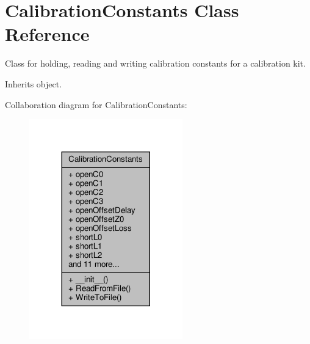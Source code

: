 \hypertarget{classSignalIntegrity_1_1Measurement_1_1CalKit_1_1CalibrationKit_1_1CalibrationConstants}{}\section{Calibration\+Constants Class Reference}
\label{classSignalIntegrity_1_1Measurement_1_1CalKit_1_1CalibrationKit_1_1CalibrationConstants}


Class for holding, reading and writing calibration constants for a calibration kit.  




Inherits object.



Collaboration diagram for Calibration\+Constants\+:\nopagebreak
\begin{figure}[H]
\begin{center}
\leavevmode
\includegraphics[width=188pt]{classSignalIntegrity_1_1Measurement_1_1CalKit_1_1CalibrationKit_1_1CalibrationConstants__coll__graph}
\end{center}
\end{figure}
